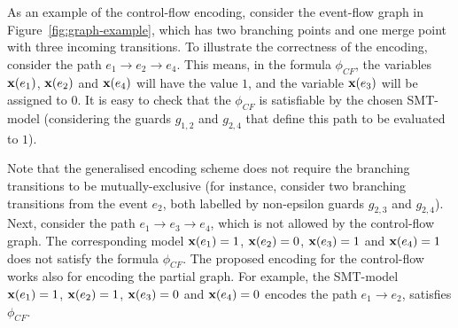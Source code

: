 As an example of the control-flow encoding, consider the event-flow graph in Figure~\ref{fig:graph-example}, which has two branching points and one merge point with three incoming transitions.
To illustrate the correctness of the encoding, consider the path $e_1 \rightarrow e_2 \rightarrow e_4$.
This means, in the formula $\phi_{CF}$, the variables $\mathbf{x}(e_1)$, $\mathbf{x}(e_2)$ and $\mathbf{x}(e_4)$ will have the value $1$, and the variable $\mathbf{x}(e_3)$ will be assigned to $0$.
It is easy to check that the $\phi_{CF}$ is satisfiable by the chosen SMT-model (considering the guards $g_{1,2}$ and $g_{2,4}$ that define this path to be evaluated to $1$).

Note that the generalised encoding scheme does not require the branching transitions to be mutually-exclusive (for instance, consider two branching transitions from the event $e_2$, both labelled by non-epsilon guards $g_{2,3}$ and $g_{2,4}$).
Next, consider the path $e_1 \rightarrow e_3 \rightarrow e_4$, which is not allowed by the control-flow graph.
The corresponding model $\mathbf{x}(e_1)=1$, $\mathbf{x}(e_2)=0$, $\mathbf{x}(e_3)=1$ and $\mathbf{x}(e_4)=1$ does not satisfy the formula $\phi_{CF}$.
The proposed encoding for the control-flow works also for encoding the partial graph.
For example, the SMT-model $\mathbf{x}(e_1)=1$, $\mathbf{x}(e_2)=1$, $\mathbf{x}(e_3)=0$ and $\mathbf{x}(e_4)=0$ encodes the path $e_1 \rightarrow e_2$, satisfies $\phi_{CF}$.

